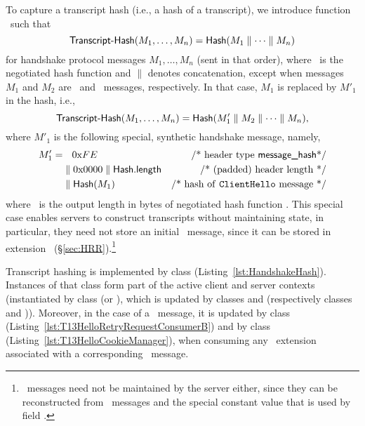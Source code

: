 To capture a transcript hash (i.e., a hash of a transcript), 
we introduce function \TranscriptHash\ such that
%
\[
  \textsf{Transcript-Hash}(M_1,\dots,M_n) = \textsf{Hash}(M_1 \parallel \dots \parallel M_n)
\]
%
for handshake protocol messages $M_1,\dots,M_n$ (sent in that order), where \Hash\ is the 
negotiated hash function and $\parallel$ denotes concatenation, except when 
messages $M_1$ and $M_2$ are \ClientHello\ and \HelloRetryRequest\ messages, 
respectively. In that case, $M_1$ is replaced by $M'_1$ in the hash, i.e., 
%
\[
  \textsf{Transcript-Hash}(M_1,\dots,M_n) = \textsf{Hash}(M'_1 \parallel M_2 \parallel \dots \parallel M_n),
\]
where $M'_1$ is the following special, synthetic handshake message, 
namely, \ifSpecNotes{}\fi
%
\begin{align*}
  M'_1 = 
    & \mathbin{\phantom{\parallel}}  0\textrm{x}FE &\textrm{/* header type \textsf{message\_hash}*/}     \\
    & \parallel                      0\textrm{x}0000 \parallel \textsf{Hash}\textsf{.length} &\textrm{/* (padded) header length */} \\
    & \parallel                      \textsf{Hash}(M_1) &\textrm{/* hash of \texttt{ClientHello}\ message */}
\end{align*}
%
where \HashLength\ is the output length in bytes of negotiated hash function \Hash.
This special case enables servers to construct transcripts without maintaining 
state, in particular, they need not store an initial \ClientHello\ message,
since it can be stored in extension \TLScookie\ (\S\ref{sec:HRR}).\footnote{%
  \HelloRetryRequest\ messages need not be maintained by the server either, since
  they can be reconstructed from \ClientHello\ messages and the special constant
  value that is used by field \HelloRetryRequest{}\TLSrandom.}

\begin{tcolorbox}
Transcript hashing is implemented by class  (Listing~\ref{lst:HandshakeHash}).
Instances of that class form part of the active client and server contexts (instantiated by class 
 (or ), which is updated by classes 
 and  (respectively classes 
 and )). Moreover, in the case 
of a \HelloRetryRequest\ message, it is updated by class 
 (Listing~\ref{lst:T13HelloRetryRequestConsumerB})
and by class  (Listing~\ref{lst:T13HelloCookieManager}), when consuming any 
\TLScookie\ extension associated with a corresponding \ClientHello\ message.
\end{tcolorbox}

